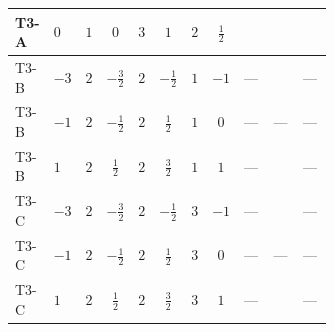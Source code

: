 \documentclass[8pt]{article}
\begin{document}
\begin{landscape}
\begin{longtable}{@{}llcccccc >{\raggedright\arraybackslash}p{0.21\linewidth} >{\raggedright\arraybackslash}p{0.21\linewidth} >{\raggedright\arraybackslash}p{0.21\linewidth}@{}}
\midrule
T3-A & $0$ & $1$ & $0$ & $3$ & $1$ & $2$ & $\frac{1}{2}$ & \scriptsize\adjustbox{max width=\linewidth}{$\begin{gathered} {m_2^2} (2 T_{\nu}^{(2)}+8 {\lambda_{S_2}^{(1)}}+4 {\lambda_{S_2}^{(A)}})\end{gathered}$} & \scriptsize\adjustbox{max width=\linewidth}{$\begin{gathered} -4 \operatorname{Tr}\!\left({M_F}\,\left({y_2}\right)^{\dagger}\,{y_2}\,\left({M_F}\right)^{\dagger}\right)\end{gathered}$} & \scriptsize\adjustbox{max width=\linewidth}{$\begin{gathered} -12 {g_2}^2 {m_2^2}\end{gathered}$} \\
\midrule
T3-B & $-3$ & $2$ & $-\frac{3}{2}$ & $2$ & $-\frac{1}{2}$ & $1$ & $-1$ & --- & \scriptsize\adjustbox{max width=\linewidth}{$\begin{gathered} -4 \operatorname{Tr}\!\left({M_F}\,\left({y_2}\right)^{\dagger}\,{y_2}\,\left({M_F}\right)^{\dagger}\right)\end{gathered}$} & --- \\
\midrule
T3-B & $-1$ & $2$ & $-\frac{1}{2}$ & $2$ & $\frac{1}{2}$ & $1$ & $0$ & --- & --- & --- \\
\midrule
T3-B & $1$ & $2$ & $\frac{1}{2}$ & $2$ & $\frac{3}{2}$ & $1$ & $1$ & --- & \scriptsize\adjustbox{max width=\linewidth}{$\begin{gathered} -4 \operatorname{Tr}\!\left({M_F}\,\left({y_2}\right)^{\dagger}\,{y_2}\,\left({M_F}\right)^{\dagger}\right)\end{gathered}$} & --- \\
\midrule
T3-C & $-3$ & $2$ & $-\frac{3}{2}$ & $2$ & $-\frac{1}{2}$ & $3$ & $-1$ & --- & \scriptsize\adjustbox{max width=\linewidth}{$\begin{gathered} -6 \operatorname{Tr}\!\left({M_F}\,\left({y_2}\right)^{\dagger}\,{y_2}\,\left({M_F}\right)^{\dagger}\right)\end{gathered}$} & --- \\
\midrule
T3-C & $-1$ & $2$ & $-\frac{1}{2}$ & $2$ & $\frac{1}{2}$ & $3$ & $0$ & --- & --- & --- \\
\midrule
T3-C & $1$ & $2$ & $\frac{1}{2}$ & $2$ & $\frac{3}{2}$ & $3$ & $1$ & --- & \scriptsize\adjustbox{max width=\linewidth}{$\begin{gathered} -6 \operatorname{Tr}\!\left({M_F}\,\left({y_2}\right)^{\dagger}\,{y_2}\,\left({M_F}\right)^{\dagger}\right)\end{gathered}$} & --- \\

\end{longtable}
\end{landscape}
\end{document}
